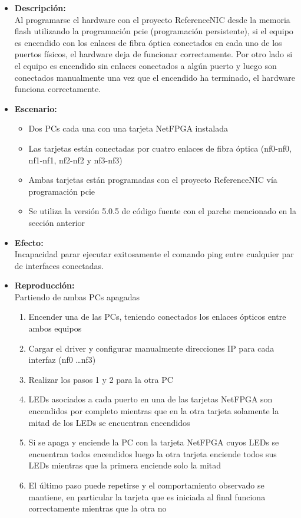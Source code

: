 \begin{itemize}
\item \textbf{Descripci\'on:}\\
Al programarse el hardware con el proyecto ReferenceNIC desde la memoria flash utilizando la programaci\'on pcie (programación persistente), si el equipo es encendido con los enlaces de fibra óptica conectados en cada uno de los puertos físicos, el hardware deja de funcionar correctamente. Por otro lado si el equipo es encendido sin enlaces conectados a algún puerto y luego son conectados manualmente una vez que el encendido ha terminado, el hardware funciona correctamente.

\item \textbf{Escenario:}
\begin{itemize}
\item Dos PCs cada una con una tarjeta NetFPGA instalada
\item Las tarjetas están conectadas por cuatro enlaces de fibra \'optica (nf0-nf0, nf1-nf1, nf2-nf2 y nf3-nf3)
\item Ambas tarjetas están programadas con el proyecto ReferenceNIC vía programaci\'on pcie
\item Se utiliza la versi\'on 5.0.5 de c\'odigo fuente con el parche mencionado en la sección anterior
\end{itemize}

\item \textbf{Efecto:}\\
Incapacidad parar ejecutar exitosamente el comando ping entre cualquier par de interfaces conectadas.

\item \textbf{Reproducci\'on:}\\
Partiendo de ambas PCs apagadas
\begin{enumerate}
\item Encender una de las PCs, teniendo conectados los enlaces \'opticos entre ambos equipos
\item Cargar el driver y configurar manualmente direcciones IP para cada interfaz (nf0 \dots nf3)
\item Realizar los pasos 1 y 2 para la otra PC
\item LEDs asociados a cada puerto en una de las tarjetas NetFPGA son encendidos por completo mientras que en la otra tarjeta solamente la mitad de los LEDs se encuentran encendidos
\item Si se apaga y enciende la PC con la tarjeta NetFPGA cuyos LEDs se encuentran todos encendidos luego la otra tarjeta enciende todos sus LEDs mientras que la primera enciende solo la mitad
\item El \'ultimo paso puede repetirse y el comportamiento observado se mantiene, en particular la tarjeta que es iniciada al final funciona correctamente mientras que la otra no
\end{enumerate} 


\end{itemize}

